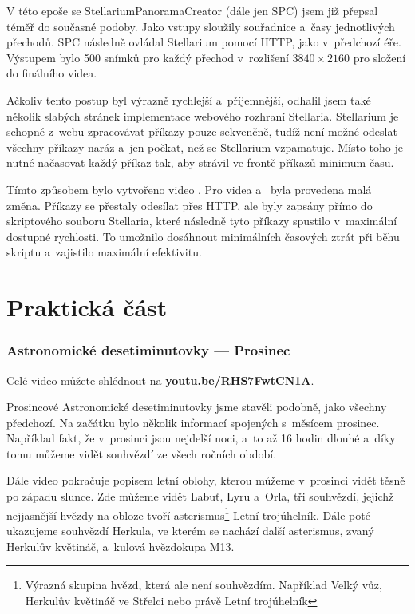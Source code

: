 \documentclass[12pt,a4paper,titlepage]{article}
\newcommand{\link}[2]{\href{#1}{\textcolor{link-color}{\textbf{#2}}}}%
\begin{document}
V této epoše se StellariumPanoramaCreator (dále jen SPC) jsem již přepsal téměř do současné podoby. Jako vstupy sloužily souřadnice a~časy jednotlivých přechodů. SPC následně ovládal Stellarium pomocí HTTP, jako v~předchozí éře. Výstupem bylo 500 snímků pro každý přechod v~rozlišení \(3840\times2160\) pro složení do finálního videa. 

Ačkoliv tento postup byl výrazně rychlejší a~příjemnější, odhalil jsem také několik slabých stránek implementace webového rozhraní Stellaria. Stellarium je schopné z~webu zpracovávat příkazy pouze sekvenčně, tudíž není možné odeslat všechny příkazy naráz a~jen počkat, než se Stellarium vzpamatuje. Místo toho je nutné načasovat každý příkaz tak, aby strávil ve frontě příkazů minimum času. 

Tímto způsobem bylo vytvořeno video . Pro videa  a~ byla provedena malá změna. Příkazy se přestaly odesílat přes HTTP, ale byly zapsány přímo do skriptového souboru Stellaria, které následně tyto příkazy spustilo v~maximální dostupné rychlosti. To umožnilo dosáhnout minimálních časových ztrát při běhu skriptu a~zajistilo maximální efektivitu.
\newpage
\part{Praktická část}
\section{Astronomické desetiminutovky --- Prosinec}
Celé video můžete shlédnout na \link{https://youtu.be/RHS7FwtCN1A}{youtu.be/RHS7FwtCN1A}.

Prosincové Astronomické desetiminutovky jsme stavěli podobně, jako všech\-ny předchozí. Na začátku bylo několik informací spojených s~měsícem prosinec. Například fakt, že v~prosinci jsou nejdelší noci, a~to až 16 hodin dlouhé a~díky tomu můžeme vidět souhvězdí ze všech ročních období. 

Dále video pokračuje popisem letní oblohy, kterou můžeme v~prosinci vidět těsně po západu slunce. Zde můžeme vidět Labuť, Lyru a~Orla, tři souhvězdí, jejichž nejjasnější hvězdy na obloze tvoří asterismus\footnote{Výrazná skupina hvězd, která ale není souhvězdím. Například Velký vůz, Herkulův květináč ve Střelci nebo právě Letní trojúhelník} Letní trojúhelník. Dále poté ukazujeme souhvězdí Herkula, ve kterém se nachází další asterismus, zvaný Herkulův květináč, a~kulová hvězdokupa M13.
\end{document}
